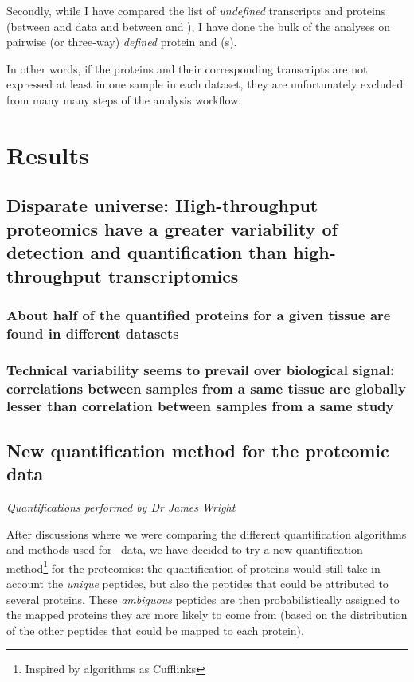 Secondly, while I have compared the list of \emph{undefined} transcripts and
proteins (between  and  data and
between  and ), I have done the bulk of the
analyses on pairwise (or three-way) \emph{defined} protein and \mRNA(s).

In other words, if the proteins and their corresponding transcripts are not
expressed at least in one sample in each dataset, they are unfortunately excluded
from many many steps of the analysis workflow.


\section{Results}
\label{sec:IntegrationResults}

\subsection{Disparate universe: High-throughput proteomics have
a greater variability of detection and quantification
than high-throughput transcriptomics}

\subsubsection{About half of the quantified proteins for a given tissue
are found in different datasets}

\subsubsection{Technical variability seems to prevail over biological signal: correlations between samples from a same tissue are globally lesser
than correlation between samples from a same study}


\subsection{New quantification method for the proteomic data}
\label{subsec:IntegrationNewMethQuant}

\textit{Quantifications performed by Dr James Wright}

After discussions where we were comparing the different quantification algorithms
and methods used for \Rnaseq\ data, we have decided to try a new quantification
method\footnote{Inspired by algorithms as Cufflinks} for the proteomics:
the quantification of proteins would still take in account the \emph{unique} peptides,
but also the peptides that could be attributed to several proteins.
These \emph{ambiguous} peptides are then probabilistically assigned to the
mapped proteins they are more likely to come from (based on the distribution of
the other peptides that could be mapped to each protein).

